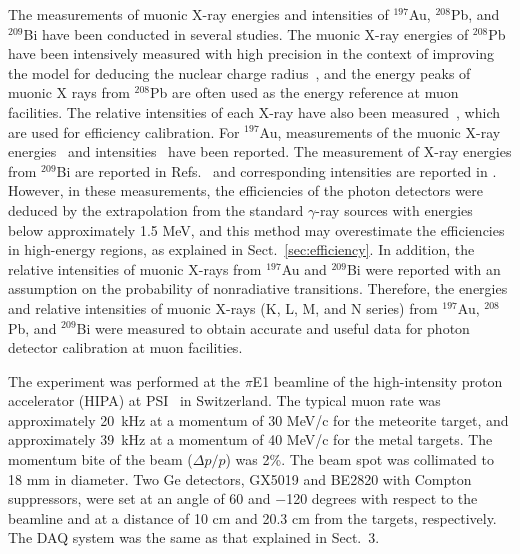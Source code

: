 The measurements of muonic X-ray energies and intensities of $^{197}$Au, $^{208}$Pb, and $^{209}$Bi have been conducted in several studies.
The muonic X-ray energies of $^{208}$Pb have been intensively measured with high precision in the context of improving the model for deducing the nuclear charge radius~\cite{Anderson1966-ir, Anderson1969-fr, Powers1968-rq, Backenstoss1970-wj, Kessler1975-sw, Bergem1988-nf, Hoehn1984-op}, and the energy peaks of muonic X rays from $^{208}$Pb are often used as the energy reference at muon facilities. 
The relative intensities of each X-ray have also been measured~\cite{Anderson1969-fr}, which are used for efficiency calibration.
For $^{197}$Au, measurements of the muonic X-ray energies~\cite{Acker1966-kh, Powers1974-aa, Measday2007-zh} and intensities~\cite{Hartmann1982-wi, Measday2007-zh} have been reported.
The measurement of X-ray energies from $^{209}$Bi are reported in Refs.~\cite{Acker1966-kh, Powers1968-rq, Bardin1967-py, Engfer1974-km, Schneuwly1972-cv, Measday2007-zh} and corresponding intensities are reported in \cite{Measday2007-zh}.
However, in these measurements, the efficiencies of the photon detectors were deduced by the extrapolation from the standard $\gamma$-ray sources with energies below approximately 1.5 MeV, and this method may overestimate the efficiencies in high-energy regions, as explained in Sect.~\ref{sec:efficiency}.
In addition, the relative intensities of muonic X-rays from $^{197}$Au and $^{209}$Bi were reported with an assumption on the probability of nonradiative transitions.
Therefore, the energies and relative intensities of muonic X-rays (K, L, M, and N series) from $^{197}$Au, $^{208}$Pb, and $^{209}$Bi were measured to obtain accurate and useful data for photon detector calibration at muon facilities.

The experiment was performed at the $\pi$E1 beamline of the high-intensity proton accelerator (HIPA) at PSI~\cite{Kiselev2021-se} in Switzerland.
The typical muon rate was approximately 20~kHz at a momentum of 30 MeV/c for the meteorite target, and approximately 39~kHz at a momentum of 40 MeV/c for the metal targets.
The momentum bite of the beam ($\Delta p/p$) was 2\%. %
The beam spot was collimated to 18 mm in diameter.
Two Ge detectors, GX5019 and BE2820 with Compton suppressors, were set at an angle of 60 and $-$120 degrees with respect to the beamline and at a distance of 10 cm and 20.3 cm from the targets, respectively.
The DAQ system was the same as that explained in Sect.~3.


